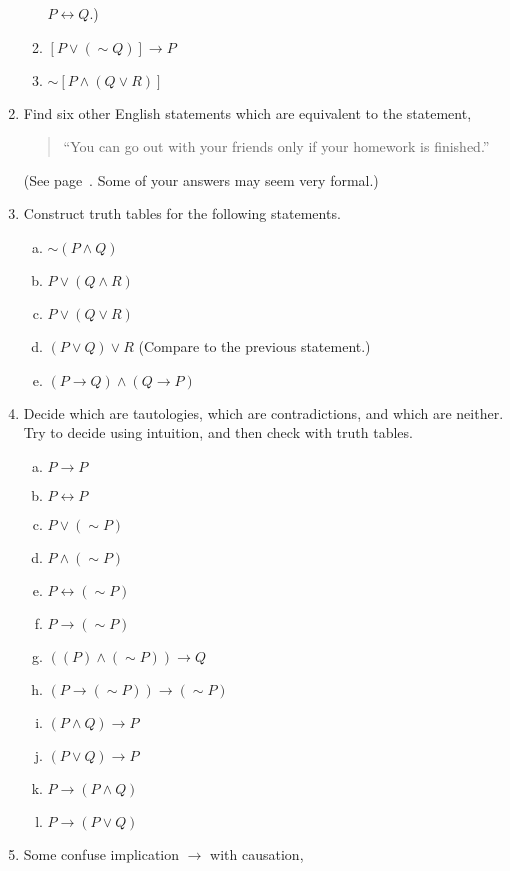 \begin{multicols}{2}
\begin{enumerate}
\begin{enumerate}
        $P\longleftrightarrow Q$.)
  \item $[P\vee(\sim Q)]\longrightarrow P$
  \item $\sim[P\wedge(Q\vee R)]$
  \end{enumerate}
\item Find six other English statements which are equivalent to
      the statement, \begin{quote}
      ``You can go out with your friends only if
      your homework is finished.'' \end{quote}
      (See page~\pageref{SixWaysForP->Q}.  Some of your answers
       may seem very formal.)
\item Construct truth tables for the following statements.
  \begin{enumerate}[(a)]
  \item $\sim(P\wedge Q)$
  \item $P\vee(Q\wedge R)$
  \item $P\vee(Q\vee R)$
  \item $(P\vee Q)\vee R$  (Compare to the previous statement.)
  \item $(P\longrightarrow Q)\wedge(Q\longrightarrow P)$
  \end{enumerate}
\item Decide which are tautologies, which are contradictions,
      and which are neither.  Try to decide using intuition, and then
      check with truth tables.
  \begin{enumerate}[(a)]
  \item $P\longrightarrow P$
  \item $P\longleftrightarrow P$
  \item $P\vee(\sim P)$
  \item $P\wedge(\sim P)$
  \item $P\longleftrightarrow(\sim P)$
  \item $P\longrightarrow(\sim P)$
  \item $((P)\wedge(\sim P))\longrightarrow Q$
  \item $(P\longrightarrow(\sim P))\longrightarrow(\sim P)$
  \item $(P\wedge Q)\longrightarrow P$
  \item $(P\vee Q)\longrightarrow P$
  \item $P\longrightarrow(P\wedge Q)$
  \item $P\longrightarrow(P\vee Q)$
   \end{enumerate}
\item Some confuse implication $\longrightarrow$ with causation,

\end{enumerate}
\end{multicols}
